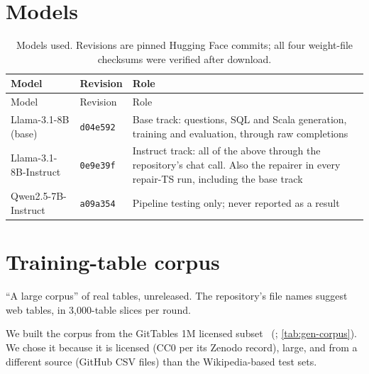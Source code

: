 \section{Models}

{\small
{}
\begin{longtable}{@{}p{3.4cm}p{2.1cm}p{9.1cm}@{}}
\caption{Models used. Revisions are pinned Hugging Face commits; all four weight-file checksums were verified after
download.}\label{tab:models}\\
\toprule\rowcolor{headshade}Model & Revision & Role\\\midrule\endfirsthead
\toprule\rowcolor{headshade}Model & Revision & Role\\\midrule\endhead
\bottomrule\endfoot
Llama-3.1-8B (base)~\cite{grattafiori2024llama3} & \texttt{d04e592} & Base track: questions, SQL and Scala generation,
training and evaluation, through raw completions\\
Llama-3.1-8B-Instruct & \texttt{0e9e39f} & Instruct track: all of the above through the repository's chat call.
Also the repairer in every repair-TS run, including the base track\\
Qwen2.5-7B-Instruct & \texttt{a09a354} & Pipeline testing only; never reported as a result\\
\end{longtable}
}

\section{Training-table corpus}\label{sec:corpus}

\begin{paperbox}[title={Paper}]
``A large corpus'' of real tables, unreleased. The repository's file names suggest web tables, in 3,000-table slices
per round.
\end{paperbox}
\begin{oursbox}
We built the corpus from the GitTables 1M licensed subset~\cite{hulsebos2021gittables,gittableszenodo}
(; \cref{tab:gen-corpus}). We chose it because it is licensed (CC0 per its Zenodo record),
large, and from a different source (GitHub CSV files) than the Wikipedia-based test sets.
\end{oursbox}

